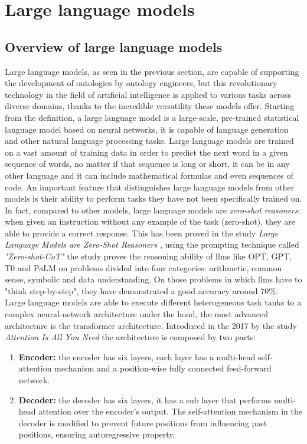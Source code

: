 \section{Large language models}
\subsection{Overview of large language models}
Large language models, as seen in the previous section, are capable of supporting the development of ontologies by ontology engineers, but this revolutionary technology in the field of artificial intelligence is applied to various tasks across diverse domains, thanks to the incredible versatility these models offer. Starting from the definition, a large language model is a large-scale, pre-trained statistical language model based on neural networks, it is capable of language generation and other natural language processing tasks.\cite{llm_wiki} Large language models are trained on a vast amount of training data in order to predict the next word in a given sequence of words, no matter if that sequence is long or short, it can be in any other language and it can include mathematical formulas and even sequences of code.\cite{llm_medium} An important feature that distinguishes large language models from other models is their ability to perform tasks they have not been specifically trained on. In fact, compared to other models, large language models are \textit{zero-shot reasoners}: when given an instruction without any example of the task (zero-shot), they are able to provide a correct response. This has been proved in the study \textit{Large Language Models are Zero-Shot Reasoners} \cite{kojima2022large}, using the prompting technique called \textit{"Zero-shot-CoT"} the study proves the reasoning ability of llms like OPT, GPT, T0 and PaLM on problems divided into four categories: arithmetic, common sense, symbolic and data understanding. On those problems in which llms have to "think step-by-step", they have demonstrated a good accuracy around 70\%.\\
Large language models are able to execute different heterogeneous task tanks to a complex neural-network architecture under the hood, the most advanced architecture is the transformer architecture. Introduced in the 2017 by the study \textit{Attention Is All You Need}\cite{vaswani2017attention} the architecture is composed by two parts:
\begin{enumerate}
    \item \textbf{Encoder:} the encoder has six layers, each layer has a multi-head self-attention mechanism and a position-wise fully connected feed-forward network.

    \item \textbf{Decoder:} the decoder has six layers, it has a sub layer that performs multi-head attention over the encoder’s output. The self-attention mechanism in the decoder is modified to prevent future positions from influencing past positions, ensuring autoregressive property.
\end{enumerate}
